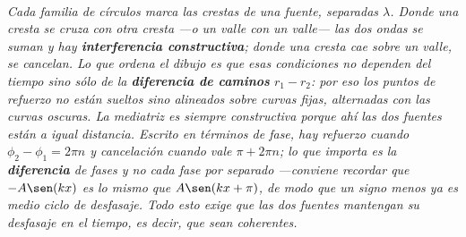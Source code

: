 \begin{center}
\\[0.5em]
{\small\itshape Cada familia de círculos marca las crestas de una fuente,
separadas $\lambda$. Donde una cresta se cruza con otra cresta ---o un valle con
un valle--- las dos ondas se suman y hay \textbf{interferencia constructiva};
donde una cresta cae sobre un valle, se cancelan. Lo que ordena el dibujo es que
esas condiciones no dependen del tiempo sino sólo de la \textbf{diferencia de
caminos} $r_1 - r_2$: por eso los puntos de refuerzo no están sueltos sino
alineados sobre curvas fijas, alternadas con las curvas oscuras. La mediatriz es
siempre constructiva porque ahí las dos fuentes están a igual distancia. Escrito
en términos de fase, hay refuerzo cuando $\phi_2 - \phi_1 = 2\pi n$ y
cancelación cuando vale $\pi + 2\pi n$; lo que importa es la \textbf{diferencia}
de fases y no cada fase por separado ---conviene recordar que $-A\sen(kx)$ es lo
mismo que $A\sen(kx+\pi)$, de modo que un signo menos ya es medio ciclo de
desfasaje. Todo esto exige que las dos fuentes mantengan su desfasaje en el
tiempo, es decir, que sean coherentes.}
\end{center}
